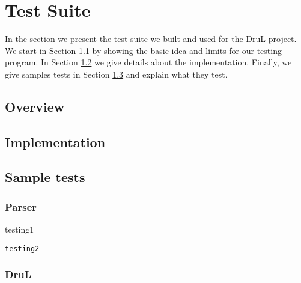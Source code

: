 

\section{Test Suite}
In the section we present the test suite we built and used for the DruL 
project. We start in Section \ref{ts:overview} by showing the basic idea
and limits for our testing program. In Section \ref{ts:implem} we give details
about the implementation. Finally, we give samples tests in 
Section \ref{ts:samples} and explain what they test.



\subsection{Overview} \label{ts:overview}



\subsection{Implementation} \label{ts:implem}


\subsection{Sample tests} \label{ts:samples}


\subsubsection{Parser}

{\color{red}
testing1
}

{\color{blue}
\begin{verbatim}
testing2
\end{verbatim}
}


\subsubsection{DruL}


